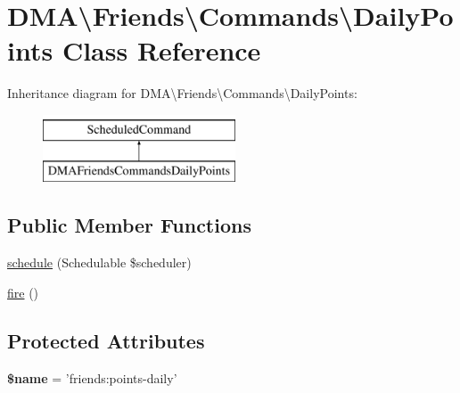 \hypertarget{classDMA_1_1Friends_1_1Commands_1_1DailyPoints}{\section{D\-M\-A\textbackslash{}Friends\textbackslash{}Commands\textbackslash{}Daily\-Points Class Reference}
\label{classDMA_1_1Friends_1_1Commands_1_1DailyPoints}
}
Inheritance diagram for D\-M\-A\textbackslash{}Friends\textbackslash{}Commands\textbackslash{}Daily\-Points\-:\begin{figure}[H]
\begin{center}
\leavevmode
\includegraphics[height=2.000000cm]{da/d3a/classDMA_1_1Friends_1_1Commands_1_1DailyPoints}
\end{center}
\end{figure}
\subsection*{Public Member Functions}
\begin{DoxyCompactItemize}
\item 
\hyperlink{classDMA_1_1Friends_1_1Commands_1_1DailyPoints_a9b86a3c5fd799e43cf001ae955501c0c}{schedule} (Schedulable \$scheduler)
\item 
\hyperlink{classDMA_1_1Friends_1_1Commands_1_1DailyPoints_a744a2cce8db836d1e2ae4db904361b1e}{fire} ()
\end{DoxyCompactItemize}
\subsection*{Protected Attributes}
\begin{DoxyCompactItemize}
\item 
\hypertarget{classDMA_1_1Friends_1_1Commands_1_1DailyPoints_affe8b91e4538363d05401b06b59ec6b0}{{\bfseries \$name} = 'friends\-:points-\/daily'}\label{classDMA_1_1Friends_1_1Commands_1_1DailyPoints_affe8b91e4538363d05401b06b59ec6b0}

\end{DoxyCompactItemize}


